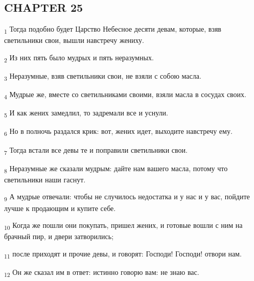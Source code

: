 \subsection{CHAPTER 25}
\begin{tcolorbox}
\textsubscript{1} Тогда подобно будет Царство Небесное десяти девам, которые, взяв светильники свои, вышли навстречу жениху.
\end{tcolorbox}
\begin{tcolorbox}
\textsubscript{2} Из них пять было мудрых и пять неразумных.
\end{tcolorbox}
\begin{tcolorbox}
\textsubscript{3} Неразумные, взяв светильники свои, не взяли с собою масла.
\end{tcolorbox}
\begin{tcolorbox}
\textsubscript{4} Мудрые же, вместе со светильниками своими, взяли масла в сосудах своих.
\end{tcolorbox}
\begin{tcolorbox}
\textsubscript{5} И как жених замедлил, то задремали все и уснули.
\end{tcolorbox}
\begin{tcolorbox}
\textsubscript{6} Но в полночь раздался крик: вот, жених идет, выходите навстречу ему.
\end{tcolorbox}
\begin{tcolorbox}
\textsubscript{7} Тогда встали все девы те и поправили светильники свои.
\end{tcolorbox}
\begin{tcolorbox}
\textsubscript{8} Неразумные же сказали мудрым: дайте нам вашего масла, потому что светильники наши гаснут.
\end{tcolorbox}
\begin{tcolorbox}
\textsubscript{9} А мудрые отвечали: чтобы не случилось недостатка и у нас и у вас, пойдите лучше к продающим и купите себе.
\end{tcolorbox}
\begin{tcolorbox}
\textsubscript{10} Когда же пошли они покупать, пришел жених, и готовые вошли с ним на брачный пир, и двери затворились;
\end{tcolorbox}
\begin{tcolorbox}
\textsubscript{11} после приходят и прочие девы, и говорят: Господи! Господи! отвори нам.
\end{tcolorbox}
\begin{tcolorbox}
\textsubscript{12} Он же сказал им в ответ: истинно говорю вам: не знаю вас.
\end{tcolorbox}
